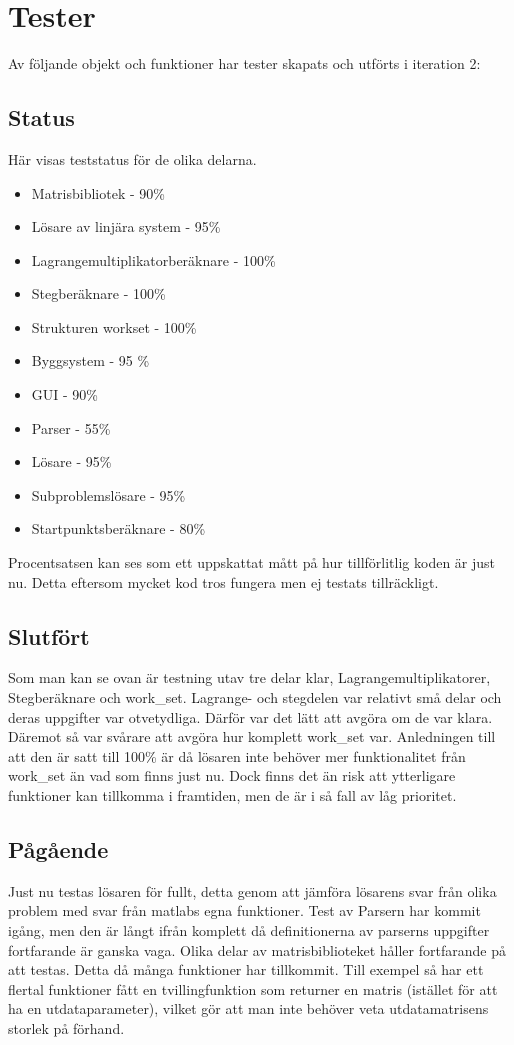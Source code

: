 \newpage
\section{Tester}
Av följande objekt och funktioner har tester skapats och utförts i iteration 2:

\subsection{Status}
Här visas teststatus för de olika delarna.
\begin{itemize}
\item{Matrisbibliotek - 90\%}
\item{Lösare av linjära system - 95\%}
\item{Lagrangemultiplikatorberäknare - 100\%}
\item{Stegberäknare - 100\%}
\item{Strukturen work\underline{\space}set - 100\%}
\item{Byggsystem - 95 \%}
\item{GUI - 90\%}
\item{Parser - 55\%}
\item{Lösare - 95\%}
\item{Subproblemslösare - 95\%}
\item{Startpunktsberäknare - 80\%}
\end{itemize}
\raggedright Procentsatsen kan ses som ett uppskattat mått på hur tillförlitlig koden är just nu. Detta eftersom mycket kod tros fungera men ej testats tillräckligt. 

\newpage
\subsection{Slutfört}
Som man kan se ovan är testning utav tre delar klar, Lagrangemultiplikatorer, Stegberäknare och work\_set. Lagrange- och stegdelen var relativt små delar och deras uppgifter var otvetydliga. Därför var det lätt att avgöra om de var klara. Däremot så var svårare att avgöra hur komplett work\_set var. Anledningen till att den är satt till 100\% är då lösaren inte behöver mer funktionalitet från work\_set än vad som finns just nu. Dock finns det än risk att ytterligare funktioner kan tillkomma i framtiden, men de är i så fall av låg prioritet.

\subsection{Pågående}
Just nu testas lösaren för fullt, detta genom att jämföra lösarens svar från olika problem med svar från matlabs egna funktioner. \newline
Test av Parsern har kommit igång, men den är långt ifrån komplett då definitionerna av parserns uppgifter fortfarande är ganska vaga. \newline 
Olika delar av matrisbiblioteket håller fortfarande på att testas. Detta då många funktioner har tillkommit. Till exempel så har ett flertal funktioner fått en tvillingfunktion som returner en matris (istället för att ha en utdataparameter), vilket gör att man inte behöver veta utdatamatrisens storlek på förhand.

